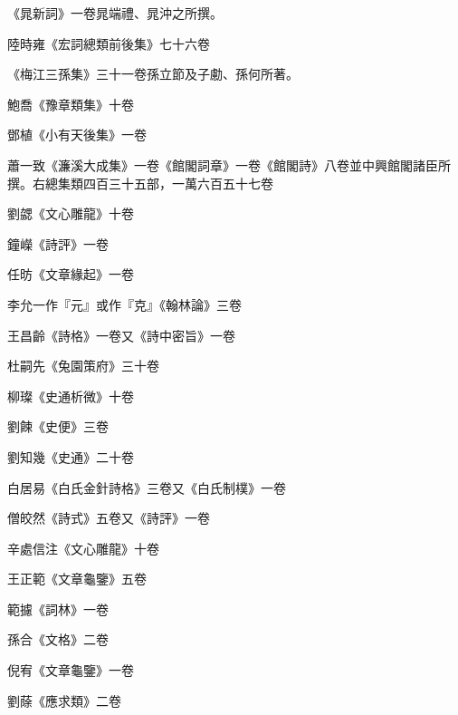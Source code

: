 \begin{pinyinscope}
 《晁新詞》一卷晁端禮、晁沖之所撰。



 陸時雍《宏詞總類前後集》七十六卷



 《梅江三孫集》三十一卷孫立節及子勴、孫何所著。



 鮑喬《豫章類集》十卷



 鄧植《小有天後集》一卷



 蕭一致《濂溪大成集》一卷《館閣詞章》一卷《館閣詩》八卷並中興館閣諸臣所撰。右總集類四百三十五部，一萬六百五十七卷



 劉勰《文心雕龍》十卷



 鐘嶸《詩評》一卷



 任昉《文章緣起》一卷



 李允一作『元』或作『克』《翰林論》三卷



 王昌齡《詩格》一卷又《詩中密旨》一卷



 杜嗣先《兔園策府》三十卷



 柳璨《史通析微》十卷



 劉餗《史便》三卷



 劉知幾《史通》二十卷



 白居易《白氏金針詩格》三卷又《白氏制樸》一卷



 僧皎然《詩式》五卷又《詩評》一卷



 辛處信注《文心雕龍》十卷



 王正範《文章龜鑒》五卷



 範攄《詞林》一卷



 孫合《文格》二卷



 倪宥《文章龜鑒》一卷



 劉蒢《應求類》二卷




\end{pinyinscope}
